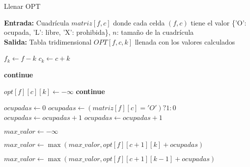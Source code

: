 \begin{algorithm}
    \caption{Llenar OPT}
    \label{alg:llenarOPT}
    \textbf{Entrada:} Cuadrícula $matriz[f, c]$ donde cada celda $(f, c)$ tiene el valor \{'O': ocupada, 'L': libre, 'X': prohibida\}, $n$: tamaño de la cuadrícula \\
    \textbf{Salida:} Tabla tridimensional $OPT[f, c, k]$ llenada con los valores calculados

    \begin{algorithmic}[1]
         
                    \State $f_k \gets f - k$
                    \State $c_k \gets c + k$
                    
                     
                        \State \textbf{continue}
                    \EndIf

                     
                        \State $opt[f][c][k] \gets -\infty$
                        \State \textbf{continue}
                    \EndIf

                    \State $ocupadas \gets 0$
                     
                        \State $ocupadas \gets (matriz[f][c] = 'O')? 1 : 0$
                    \Else
                            \State $ocupadas \gets ocupadas + 1$
                        \EndIf
                            \State $ocupadas \gets ocupadas + 1$
                        \EndIf
                    \EndIf
                    
                    \State $max\_valor \gets -\infty$ 
                    
                     
                        \State $max\_valor \gets \max(max\_valor, opt[f][c + 1][k] + ocupadas)$
                    \EndIf

                     
                        \State $max\_valor \gets \max(max\_valor, opt[f][c + 1][k - 1] + ocupadas)$
                    \EndIf


\end{algorithmic}
\end{algorithm}

